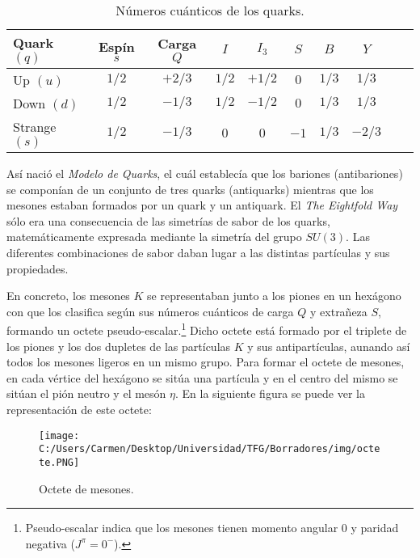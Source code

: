 \begin{table}[h]
	\centering
	\begin{tabular}{l*{8}{c}r}
\hline
Quark $(q)$ & Espín $s$ & Carga $Q$ & $I$ & $I_3$ & $S$ & $B$ & $Y$\\ 
\hline
Up $(u)$ & $1/2$ & $+2/3$ & $1/2$ & $+1/2$ & $0$ & $1/3$ & $1/3$\\
Down $(d)$ & $1/2$ & $-1/3$ & $1/2$ & $-1/2$ & $0$ & $1/3$ & $1/3$\\
Strange $(s)$ & $1/2$ & $-1/3$ & $0$ & $0$ & $-1$ & $1/3$ & $-2/3$\\
\hline
	\end{tabular}
\caption[Números cuánticos de los quarks]{Números cuánticos de los quarks. \cite{notas2020}} %
\label{tab:propiedades_quarks}
\end{table}


Así nació el \textit{Modelo de Quarks}, el cuál establecía que los bariones (antibariones) se componían de un conjunto de tres quarks (antiquarks) mientras que los mesones estaban formados por un quark y un antiquark. El \textit{The Eightfold Way} sólo era una consecuencia de las simetrías de sabor de los quarks, matemáticamente expresada mediante la simetría del grupo $SU(3)$. Las diferentes combinaciones de sabor daban lugar a las distintas partículas y sus propiedades.

En concreto, los mesones $K$ se representaban junto a los piones en un hexágono con que los clasifica según sus números cuánticos de carga $Q$ y extrañeza $S$, formando un octete pseudo-escalar.\footnote{Pseudo-escalar indica que los mesones tienen momento angular 0 y paridad negativa ($J^\pi = 0^-$).} Dicho octete está formado por el triplete de los piones y los dos dupletes de las partículas $K$ y sus antipartículas, aunando así todos los mesones ligeros en un mismo grupo. Para formar el octete de mesones, en cada vértice del hexágono se sitúa una partícula y en el centro del mismo se sitúan el pión neutro y el mesón $\eta$. En la siguiente figura se puede ver la representación de este octete:

\begin{figure}[h]
	\centering
	\texttt{[image: C:/Users/Carmen/Desktop/Universidad/TFG/Borradores/img/octete.PNG]}
	\caption[Octete de mesones]
	{Octete de mesones. \cite{Griffiths2008}}
	\label{fig:octete}
\end{figure}

